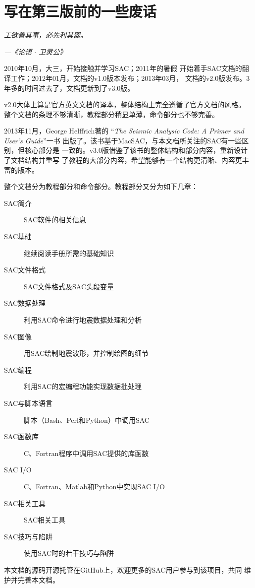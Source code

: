 {\section*{写在第三版前的一些废话}}

\begin{shadequote*}
\Large\emph{工欲善其事，必先利其器。}
\par\hfill\emph{\normalsize---《论语 $\cdot$ 卫灵公》}
\end{shadequote*}

2010年10月，大三，开始接触并学习SAC；2011年的暑假
开始着手SAC文档的翻译工作；2012年01月，文档的v1.0版本发布；2013年03月，
文档的v2.0版发布。3年多的时间过去了，文档更新到了v3.0版。

v2.0大体上算是官方英文文档的译本，整体结构上完全遵循了官方文档的风格。
整个文档的条理不够清晰，教程部分稍显单薄，命令部分也不够完善。

2013年11月，George Helffrich著的
``\emph{The Seismic Analysic Code: A Primer and User's Guide}''一书
出版了。该书基于MacSAC，与本文档所关注的SAC有一些区别，但核心部分是
一致的。v3.0版借鉴了该书的整体结构和部分内容，重新设计了文档结构并重写
了教程的大部分内容，希望能够有一个结构更清晰、内容更丰富的版本。

整个文档分为教程部分和命令部分。教程部分又分为如下几章：
\begin{description}
\item[SAC简介] SAC软件的相关信息
\item[SAC基础] 继续阅读手册所需的基础知识
\item[SAC文件格式] SAC文件格式及SAC头段变量
\item[SAC数据处理] 利用SAC命令进行地震数据处理和分析
\item[SAC图像] 用SAC绘制地震波形，并控制绘图的细节
\item[SAC编程] 利用SAC的宏编程功能实现数据批处理
\item[SAC与脚本语言] 脚本（Bash、Perl和Python）中调用SAC
\item[SAC函数库] C、Fortran程序中调用SAC提供的库函数
\item[SAC I/O] C、Fortran、Matlab和Python中实现SAC I/O
\item[SAC相关工具] SAC相关工具
\item[SAC技巧与陷阱] 使用SAC时的若干技巧与陷阱
\end{description}

本文档的源码开源托管在GitHub上，欢迎更多的SAC用户参与到该项目，共同
维护并完善本文档。


